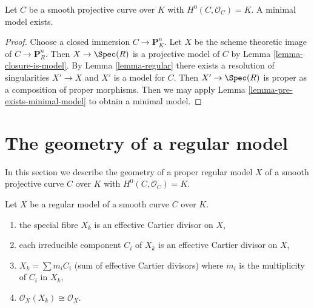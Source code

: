 \begin{proposition}
\label{proposition-exists-minimal-model}
Let $C$ be a smooth projective curve over $K$ with
$H^0(C, \mathcal{O}_C) = K$. A minimal model exists.
\end{proposition}

\begin{proof}
Choose a closed immersion $C \to \mathbf{P}^n_K$. Let
$X$ be the scheme theoretic image of $C \to \mathbf{P}^n_R$.
Then $X \to \Spec(R)$ is a projective model of $C$ by
Lemma \ref{lemma-closure-is-model}.
By Lemma \ref{lemma-regular} there exists a resolution
of singularities $X' \to X$ and $X'$ is a model for $C$.
Then $X' \to \Spec(R)$ is proper as a composition of proper morphisms.
Then we may apply Lemma \ref{lemma-pre-exists-minimal-model}
to obtain a minimal model.
\end{proof}





\section{The geometry of a regular model}
\label{section-special-fibre}

\noindent
In this section we describe the geometry of a proper regular model $X$ of a
smooth projective curve $C$ over $K$ with $H^0(C, \mathcal{O}_C) = K$.

\begin{lemma}
\label{lemma-divisor-special-fiber}
Let $X$ be a regular model of a smooth curve $C$ over $K$.
\begin{enumerate}
\item the special fibre $X_k$ is an effective Cartier divisor on $X$,
\item each irreducible component $C_i$ of $X_k$ is an effective
Cartier divisor on $X$,
\item $X_k = \sum m_i C_i$ (sum of effective Cartier divisors)
where $m_i$ is the multiplicity of $C_i$ in $X_k$,
\item $\mathcal{O}_X(X_k) \cong \mathcal{O}_X$.
\end{enumerate}
\end{lemma}

